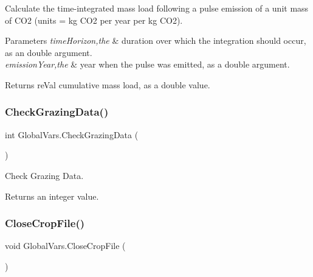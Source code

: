 Calculate the time-\/integrated mass load following a pulse emission of a unit mass of C\+O2 (units = kg C\+O2 per year per kg C\+O2). 


\begin{DoxyParams}{Parameters}
{\em time\+Horizon,the} & duration over which the integration should occur, as an double argument. \\
\hline
{\em emission\+Year,the} & year when the pulse was emitted, as a double argument. \\
\hline
\end{DoxyParams}
\begin{DoxyReturn}{Returns}
re\+Val cumulative mass load, as a double value. 
\end{DoxyReturn}
\mbox{\label{class_global_vars_ad893d360c7c5ac004598509b57351d90}} 
\subsubsection{\texorpdfstring{CheckGrazingData()}{CheckGrazingData()}}
{\footnotesize\ttfamily int Global\+Vars.\+Check\+Grazing\+Data (\begin{DoxyParamCaption}{ }\end{DoxyParamCaption})\hspace{0.3cm}{\ttfamily [inline]}}



Check Grazing Data. 

\begin{DoxyReturn}{Returns}
an integer value. 
\end{DoxyReturn}
\mbox{\label{class_global_vars_a6251df0946f189d52366f2fe300cc2dd}} 
\subsubsection{\texorpdfstring{CloseCropFile()}{CloseCropFile()}}
{\footnotesize\ttfamily void Global\+Vars.\+Close\+Crop\+File (\begin{DoxyParamCaption}{ }\end{DoxyParamCaption})\hspace{0.3cm}{\ttfamily [inline]}}



